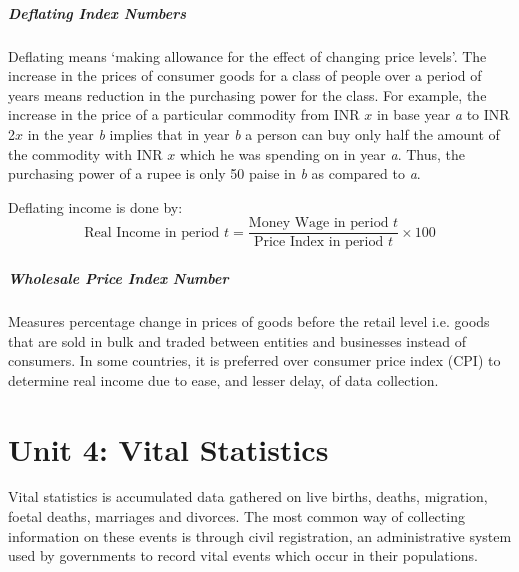\documentclass[
10pt, %
a4paper, %
]{report}
\begin{document}
\paragraph*{Deflating Index Numbers}
Deflating means ‘making allowance for the effect of changing price levels’. The increase in the prices of consumer goods for a class of people over a period of years means reduction in the purchasing power for the class. For example, the increase in the price of a particular commodity from INR \(x\) in base year \textit{a} to INR 2\(x\) in the year \textit{b} implies that in year \textit{b} a person can buy only half the amount of the commodity with INR \(x\) which he was spending on in year \textit{a}. Thus, the purchasing power of a rupee is only 50 paise in \textit{b} as compared to \textit{a}.

Deflating income is done by:
\[
\text{Real Income in period }t = \frac{\text{Money Wage in period }t}{\text{Price Index in period }t} \times 100
\]

\paragraph*{Wholesale Price Index Number}
Measures percentage change in prices of goods before the retail level i.e. goods that are sold in bulk and traded between entities and businesses instead of consumers. In some countries, it is preferred over consumer price index (CPI) to determine real income due to ease, and lesser delay, of data collection.

\chapter{Unit 4: Vital Statistics}

Vital statistics is accumulated data gathered on live births, deaths, migration, foetal deaths, marriages and divorces. The most common way of collecting information on these events is through civil registration, an administrative system used by governments to record vital events which occur in their populations.
\end{document}
